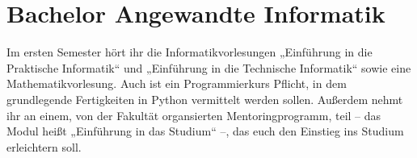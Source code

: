\section{Bachelor Angewandte Informatik}

Im ersten Semester hört ihr die Informatikvorlesungen „Einführung in die Praktische Informatik“
und „Einführung in die Technische Informatik“ sowie eine Mathematikvorlesung.
Auch ist ein Programmierkurs Pflicht, in dem grundlegende Fertigkeiten in Python vermittelt werden
sollen. Außerdem nehmt ihr an einem, von der Fakultät organsierten Mentoringprogramm, teil -- das Modul
heißt „Einführung in das Studium“ --, das euch den Einstieg ins Studium erleichtern soll.

